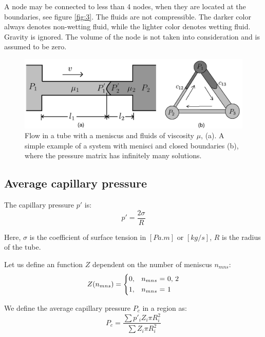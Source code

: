 \documentclass[
	12pt
] {article}
\begin{document}
	A node may be connected to less than 4 nodes, when they are located at the boundaries, see figure \ref{fig:3}. The fluids are not compressible. The darker color always denotes non-wetting fluid, while the lighter color denotes wetting fluid. Gravity is ignored. The volume of the node is not taken into consideration and is assumed to be zero.
	
	\begin{figure}
		\centering
		\includegraphics[width=\textwidth]{fig_2_2200x700}
		\caption{Flow in a tube with a meniscus and fluids of viscosity $\mu$,  (a). A simple example of a system with menisci and closed boundaries (b), where the pressure matrix has infinitely many solutions.}
		\label{fig:2}
	\end{figure}
	
\subsection{Average capillary pressure}
	The capillary pressure $p'$ is:
	\begin{equation}
		p' = \frac{2 \sigma}{R}
	\end{equation}
	
	Here, $\sigma$ is the coefficient of surface tension in $[Pa.m]$ or $[kg/s]$, $R$ is the radius of the tube.
	
	Let us define an function $Z$ dependent on the number of meniscus $n_{mns}$:
	\begin{equation} \label{eq:average-capillary-pressure-sign}
		Z(n_{mns}) = 
		\begin{dcases}
			0,&\text{$n_{mns}$ = 0, 2}\\
			1,&\text{$n_{mns}$ = 1}\\
		\end{dcases}
	\end{equation}
	
	We define the average capillary pressure $P_c$ in a region as:
	\begin{equation} \label{eq:average-capillary-pressure}
		P_c = \frac{\sum p'_i Z_i \pi R_i^2}{\sum Z_i \pi R_i^2}
	\end{equation}
	
\end{document}
